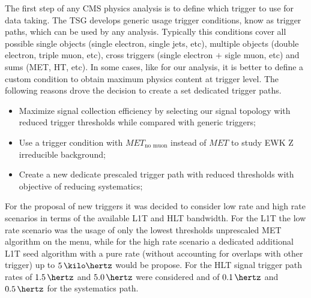 


The first step of any \gls{CMS} physics analysis is to define which trigger to use for data taking. The \gls{TSG} develops generic usage trigger conditions, know as trigger paths, which can be used by any analysis. Typically this conditions cover all possible single objects (single electron, single jets, etc), multiple objects (double electron, triple muon, etc), cross triggers (single electron $+$ sigle muon, etc) and sums (\gls{MET}, \gls{HT}, etc). In some cases, like for our analysis, it is better to define a custom condition to obtain maximum physics content at trigger level. The following reasons drove the decision to create a set dedicated trigger paths.

\begin{itemize}
  \item Maximize signal collection efficiency by selecting our signal topology with reduced trigger thresholds while compared with generic triggers;
  \item Use a trigger condition with $MET_{\text{no muon}}$ instead of $MET$ to study \gls{EWK} Z irreducible background;
  \item Create a new dedicate prescaled trigger path with reduced thresholds with objective of reducing systematics;
\end{itemize}

For the proposal of new triggers it was decided to consider low rate and high rate scenarios in terms of the available \gls{L1T} and \gls{HLT} bandwidth. For the \gls{L1T} the low rate scenario was the usage of only the lowest thresholds unprescaled \gls{MET} algorithm on the menu, while for the high rate scenario a dedicated additional \gls{L1T} seed algorithm with a pure rate (without accounting for overlaps with other trigger) up to $5\,\kilo\hertz$ would be propose. For the \gls{HLT} signal trigger path rates of $1.5\,\hertz$ and $5.0\,\hertz$ were considered and of $0.1\,\hertz$ and $0.5\,\hertz$ for the systematics path.

